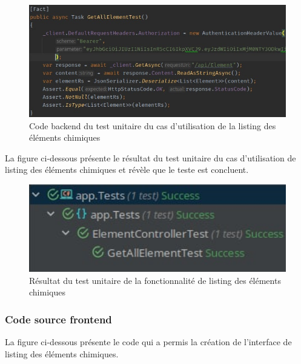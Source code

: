 \begin{figure}[H]
	\centering
	\includegraphics[width=1\textwidth]{img/utetlist2}
	\caption{Code backend du test unitaire du cas d'utilisation de la listing des éléments chimiques}
\end{figure}

La figure ci-dessous présente le résultat du test unitaire du cas d'utilisation de listing des éléments chimiques et révèle que le teste est concluent.

\begin{figure}[H]
	\centering
	\includegraphics[width=1\textwidth]{img/utetlist}
	\caption{Résultat du test unitaire de la fonctionnalité de listing des éléments chimiques}
\end{figure}

\subsubsection{Code source frontend}

La figure ci-dessous présente le code qui a permis la création de l'interface de listing des éléments chimiques.

